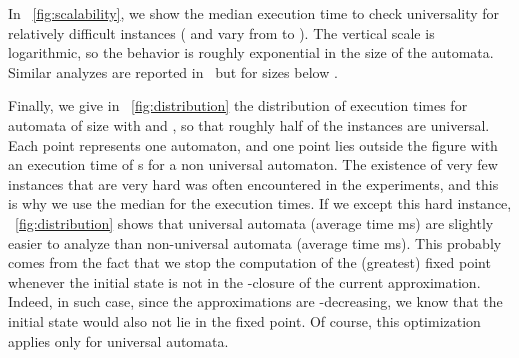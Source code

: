 \documentclass{LMCS}
\begin{document}
In \figurename~\ref{fig:scalability}, we show the median execution time to 
check universality for relatively difficult instances ( and  vary from
 to ). The vertical scale is logarithmic, so the behavior is roughly 
exponential in the size of the automata. Similar analyzes are reported 
in~\cite{TabakovV07} but for sizes below .

Finally, we give in \figurename~\ref{fig:distribution} the
distribution of execution times for  automata of size  with
 and , so that roughly half of the instances are
universal. Each point represents one automaton, and one point lies
outside the figure with an execution time of s for a non
universal automaton. The existence of very few instances that are very
hard was often encountered in the experiments, and this is why we use
the median for the execution times. If we except this hard instance,
\figurename~\ref{fig:distribution} shows that universal automata
(average time ms) are slightly easier to analyze than
non-universal automata (average time ms).  This probably comes
from the fact that we stop the computation of the (greatest) fixed
point whenever the initial state is not in the -closure
of the current approximation. Indeed, in such
case, since the approximations are -decreasing,
we know that the initial state would also not lie in the fixed point.
Of course, this optimization applies only for universal automata.
\end{document}
